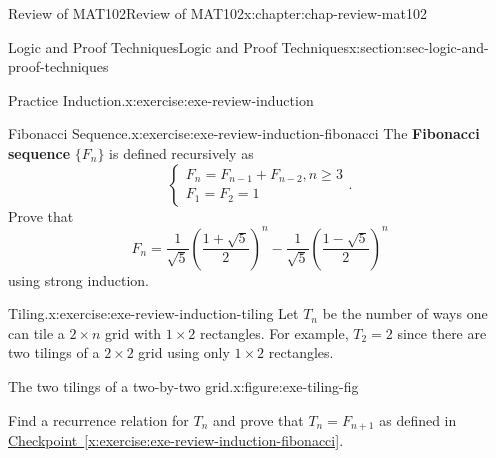 \documentclass[oneside,10pt,]{book}
\newcommand{\xreffont}{\relax}
\newcommand{\terminology}[1]{\textbf{#1}}
\numberwithin{equation}{section}
\begin{document}
\begin{chapterptx}{Review of MAT102}{}{Review of MAT102}{}{}{x:chapter:chap-review-mat102}
\begin{sectionptx}{Logic and Proof Techniques}{}{Logic and Proof Techniques}{}{}{x:section:sec-logic-and-proof-techniques}
\begin{inlineexercise}{Practice Induction.}{x:exercise:exe-review-induction}
\end{inlineexercise}%
\begin{inlineexercise}{Fibonacci Sequence.}{x:exercise:exe-review-induction-fibonacci}%
The \terminology{Fibonacci sequence} \(\{F_n\}\) is defined recursively as%
\begin{equation*}
\begin{cases} F_n = F_{n-1} + F_{n-2}, n \geq 3 \\
F_1 = F_2 = 1 \end{cases}\text{.}
\end{equation*}
Prove that%
\begin{equation*}
F_n = \frac{1}{\sqrt{5}}\left(\frac{1+\sqrt{5}}{2}\right)^n - \frac{1}{\sqrt{5}}\left(\frac{1-\sqrt{5}}{2}\right)^n
\end{equation*}
using strong induction.%
\end{inlineexercise}%
\begin{inlineexercise}{Tiling.}{x:exercise:exe-review-induction-tiling}%
Let \(T_n\) be the number of ways one can tile a \(2 \times n\) grid with \(1 \times 2\) rectangles. For example, \(T_2 = 2\) since there are two tilings of a \(2 \times 2\) grid using only \(1 \times 2\) rectangles.%
\begin{figureptx}{The two tilings of a two-by-two grid.}{x:figure:exe-tiling-fig}{}%
\begin{image}{0.25}{0.5}{0.25}%
%
\end{image}%
\tcblower
\end{figureptx}%
Find a recurrence relation for \(T_n\) and prove that \(T_n = F_{n+1}\) as defined in \hyperref[x:exercise:exe-review-induction-fibonacci]{Checkpoint~{\xreffont\ref{x:exercise:exe-review-induction-fibonacci}}}.%
\end{inlineexercise}%
\end{sectionptx}
%
%
\typeout{************************************************}

\end{chapterptx}
\end{document}
